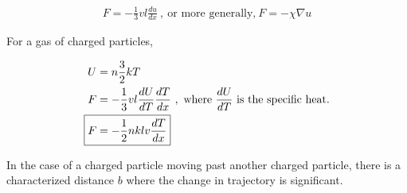 \documentclass[10pt,letterpaper,final]{book}
\begin{document}
\begin{align}
F = -\frac{1}{3}vl\frac{du}{dx}~,~\text{or more generally,}~F=-\chi \nabla u
\end{align}

For a gas of charged particles,

\begin{align}
U &= n\frac{3}{2}kT\\
F &= -\frac{1}{3}vl \frac{dU}{dT}\frac{dT}{dx}~,~\text{where}~\frac{dU}{dT}~\text{is the specific heat}.\\
\Aboxed{F &= -\frac{1}{2}nklv \frac{dT}{dx}}
\end{align}

In the case of a charged particle moving past another charged particle, there is a characterized distance $b$ where the change in trajectory is significant. 
\end{document}
